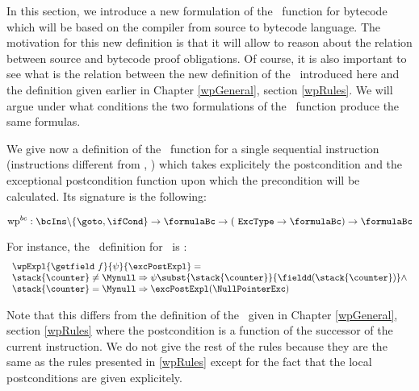 
\newtheorem{wpSeq}{Definition}[section]
\newtheorem{wpExpr}[wpSeq]{Definition}


In this section, we introduce a new formulation of the \wpName \ function  for bytecode 
which will be based on the compiler from source to bytecode  language.
The motivation for this new definition is that it will allow to reason about the
 relation between source and bytecode proof
obligations. 
Of course, it is also important to see what is the relation between the new definition
of the \wpName \ introduced here and the definition  given earlier in Chapter \ref{wpGeneral}, section \ref{wpRules}. 
We will argue under what conditions the two formulations of the \wpName \ function produce the same formulas.




We give now a definition of the \wpName \ function for a single sequential instruction (instructions different from \goto, \ifCond) which takes
explicitely the postcondition and the exceptional postcondition function 
upon which the precondition will be calculated. Its signature is the following:

$$ \mbox{\rm\textrm{wp}}^{bc} : \bcIns \backslash \{ \goto , \ifCond \}  \rightarrow \formulaBc \rightarrow ( \mbox{ \rm \texttt{ExcType}} \rightarrow \formulaBc ) \rightarrow \formulaBc$$

For instance, the \wpName \ definition for \getfield \ is :
$$ \begin{array}{l} \wpExpl{\getfield \ f }{ \psi  }{ \excPostExpl} = \\
		         \stack{\counter } \neq \Mynull \Rightarrow 
			                \psi   \subst{ \stack{\counter} }{ \fieldd(\stack{\counter})} 		                    
			  \wedge \\
			  \stack{\counter }  = \Mynull  \Rightarrow   \excPostExpl( \NullPointerExc )
			  \end{array}$$ 

Note that this differs from the definition of the \wpName \  given in Chapter \ref{wpGeneral}, section \ref{wpRules} where the postcondition 
is a function of the successor of the current instruction. We do not give the rest of the rules because they are the same as 
the rules presented in \ref{wpRules} except for the fact that the local postconditions are given explicitely.


